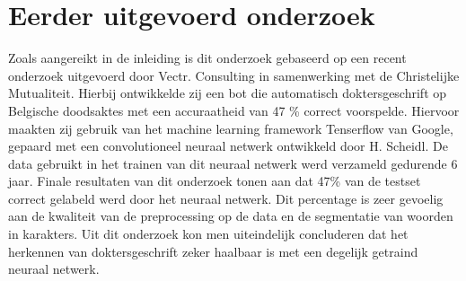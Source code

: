 \section{Eerder uitgevoerd onderzoek}
Zoals aangereikt in de inleiding is dit onderzoek gebaseerd op een recent onderzoek uitgevoerd door Vectr. Consulting in samenwerking met de Christelijke Mutualiteit. Hierbij ontwikkelde zij een bot die automatisch doktersgeschrift op Belgische doodsaktes met een accuraatheid van 47 \% correct voorspelde. Hiervoor maakten zij gebruik van het machine learning framework Tenserflow van Google, gepaard met een convolutioneel neuraal netwerk ontwikkeld door H. Scheidl. De data gebruikt in het trainen van dit neuraal netwerk werd verzameld gedurende 6 jaar. Finale resultaten van dit onderzoek tonen aan dat 47\% van de testset correct gelabeld werd door het neuraal netwerk. Dit percentage is zeer gevoelig aan de kwaliteit van de preprocessing op de data en de segmentatie van woorden in karakters. Uit dit onderzoek kon men uiteindelijk concluderen dat het herkennen van doktersgeschrift zeker haalbaar is met een degelijk getraind neuraal netwerk. 

